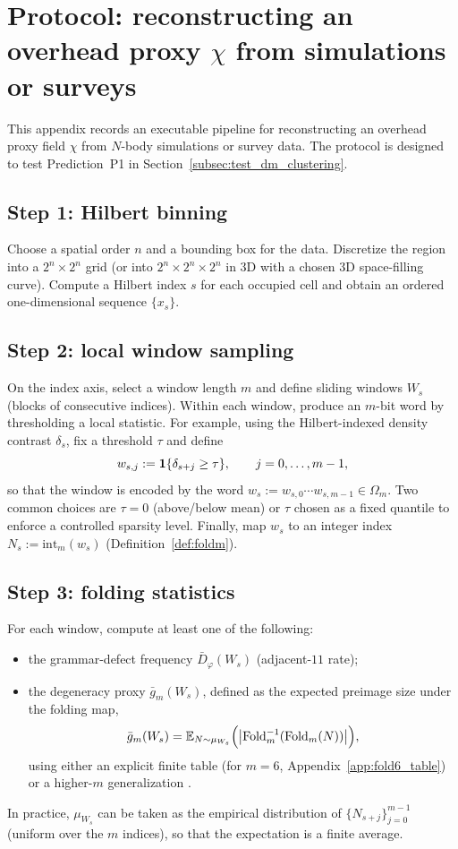 
\section{Protocol: reconstructing an overhead proxy \texorpdfstring{$\chi$}{chi} from simulations or surveys}
\label{app:data_protocol}

This appendix records an executable pipeline for reconstructing an overhead proxy field $\chi$ from $N$-body simulations or survey data.
The protocol is designed to test Prediction~P1 in Section~\ref{subsec:test_dm_clustering}.

\subsection{Step 1: Hilbert binning}
Choose a spatial order $n$ and a bounding box for the data.
Discretize the region into a $2^n\times 2^n$ grid (or into $2^n\times 2^n\times 2^n$ in $3$D with a chosen 3D space-filling curve).
Compute a Hilbert index $s$ for each occupied cell and obtain an ordered one-dimensional sequence $\{x_s\}$.

\subsection{Step 2: local window sampling}
On the index axis, select a window length $m$ and define sliding windows $W_s$ (blocks of consecutive indices).
Within each window, produce an $m$-bit word by thresholding a local statistic.
For example, using the Hilbert-indexed density contrast $\delta_s$, fix a threshold $\tau$ and define
\[
w_{s,j}:=\mathbf{1}\{\delta_{s+j}\ge \tau\},\qquad j=0,\dots,m-1,
\]
so that the window is encoded by the word $w_s:=w_{s,0}\cdots w_{s,m-1}\in\Omega_m$.
Two common choices are $\tau=0$ (above/below mean) or $\tau$ chosen as a fixed quantile to enforce a controlled sparsity level.
Finally, map $w_s$ to an integer index $N_s:=\mathrm{int}_m(w_s)$ (Definition~\ref{def:foldm}).

\subsection{Step 3: folding statistics}
For each window, compute at least one of the following:
\begin{itemize}
\item the grammar-defect frequency $\bar{D}_\varphi(W_s)$ (adjacent-$11$ rate);
\item the degeneracy proxy $\bar{g}_m(W_s)$, defined as the expected preimage size under the folding map,
\[
\bar{g}_m(W_s)=\mathbb{E}_{N\sim\mu_{W_s}}\Bigl(\bigl|\mathrm{Fold}_m^{-1}(\mathrm{Fold}_m(N))\bigr|\Bigr),
\]
using either an explicit finite table (for $m=6$, Appendix~\ref{app:fold6_table}) or a higher-$m$ generalization \cite{Ma2025RF}.
\end{itemize}
In practice, $\mu_{W_s}$ can be taken as the empirical distribution of $\{N_{s+j}\}_{j=0}^{m-1}$ (uniform over the $m$ indices), so that the expectation is a finite average.

